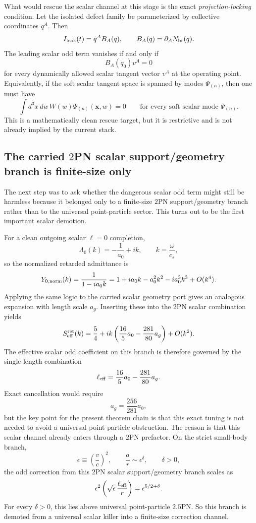 \documentclass[11pt]{article}
\begin{document}
What would rescue the scalar channel at this stage is the exact
\emph{projection-locking} condition.  Let the isolated defect family be
parameterized by collective coordinates \(q^A\).  Then
\[
I_{\rm leak}(t)=\dot q^A B_A(q),
\qquad
B_A(q)=\partial_A N_{\rm br}(q).
\]
The leading scalar odd term vanishes if and only if
\[
B_A(q_0)v^A=0
\]
for every dynamically allowed scalar tangent vector \(v^A\) at the operating
point.  Equivalently, if the soft scalar tangent space is spanned by modes
\(\Psi_{(n)}\), then one must have
\[
\int d^3x\,dw\,W(w)\Psi_{(n)}(\mathbf x,w)=0
\qquad
\text{for every soft scalar mode }\Psi_{(n)}.
\]
This is a mathematically clean rescue target, but it is restrictive and is not
already implied by the current stack.

\subsection{The carried \texorpdfstring{$2$}{2}PN scalar support/geometry branch is finite-size only}
\label{sec:scalar-audit-2pn-fs}

The next step was to ask whether the dangerous scalar odd term might still be
harmless because it belonged only to a finite-size $2$PN support/geometry branch
rather than to the universal point-particle sector.  This turns out to be the
first important scalar demotion.

For a clean outgoing scalar \(\ell=0\) completion,
\[
\Lambda_0(k)=-\frac{1}{a_0}+ik,
\qquad
k=\frac{\omega}{c_s},
\]
so the normalized retarded admittance is
\[
Y_{0,\rm norm}(k)
=
\frac{1}{1-ia_0k}
=
1+ia_0k-a_0^2k^2-ia_0^3k^3+O(k^4).
\]
Applying the same logic to the carried scalar geometry port gives an analogous
expansion with length scale \(a_g\).  Inserting these into the $2$PN scalar
combination yields
\[
S_{\rm eff}^{\rm ret}(k)
=
\frac54
+
 ik\left(\frac{16}{5}a_0-\frac{281}{80}a_g\right)
+
O(k^2).
\]
The effective scalar odd coefficient on this branch is therefore governed by the
single length combination
\[
\ell_{\rm eff}=\frac{16}{5}a_0-\frac{281}{80}a_g.
\]
Exact cancellation would require
\[
a_g=\frac{256}{281}a_0,
\]
but the key point for the present theorem chain is that this exact tuning is not
needed to avoid a universal point-particle obstruction.  The reason is that this
scalar channel already enters through a $2$PN prefactor.  On the strict
small-body branch,
\[
\epsilon\equiv\left(\frac{v}{c}\right)^2,
\qquad
\frac{a}{r}\sim \epsilon^\delta,
\qquad \delta>0,
\]
the odd correction from this $2$PN scalar support/geometry branch scales as
\[
\epsilon^2\left(\sqrt\epsilon\,\frac{\ell_{\rm eff}}{r}\right)
=
\epsilon^{5/2+\delta}.
\]
For every \(\delta>0\), this lies above universal point-particle $2.5$PN.  So
this branch is demoted from a universal scalar killer into a finite-size
correction channel.
\end{document}
